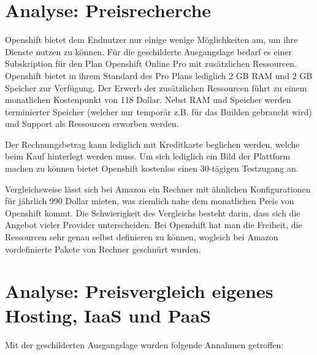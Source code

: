 \documentclass[12pt,a4paper]{article}
\begin{document}
\section{Analyse: Preisrecherche}

Openshift bietet dem Endnutzer nur einige wenige Möglichkeiten am, um ihre Dienste nutzen zu können. Für die geschilderte Ausgangslage bedarf es einer Subskription für den Plan Openshift Online Pro mit zusätzlichen Ressourcen. Openshift bietet in ihrem Standard des
Pro Plans lediglich 2 GB RAM und 2 GB Speicher zur Verfügung. Der Erwerb der zusätzlichen Ressourcen führt zu einem monatlichen Kostenpunkt von 118 Dollar. Nebst RAM und Speicher werden terminierter Speicher (welcher nur temporär z.B. für das Builden gebraucht wird)
und Support als Ressourcen erworben werden.

Der Rechnungsbetrag kann lediglich mit Kreditkarte beglichen werden, welche beim Kauf hinterlegt werden muss. Um sich lediglich ein Bild der Plattform machen zu können bietet Openshift kostenlos einen 30-tägigen Testzugang an.

Vergleichsweise lässt sich bei Amazon ein Rechner mit ähnlichen Konfigurationen für jährlich 990 Dollar mieten, was ziemlich nahe dem monatlichen Preis von Openshift kommt. Die Schwierigkeit des Vergleichs besteht darin, dass sich die Angebot vieler Provider unterscheiden.
Bei Openshift hat man die Freiheit, die Ressourcen sehr genau selbst definieren zu können, wogleich bei Amazon vordefinierte Pakete von Rechner geschnürt wurden.

\section{Analyse: Preisvergleich eigenes Hosting, IaaS und PaaS}

Mit der geschilderten Ausgangslage wurden folgende Annahmen getroffen:
\end{document}
